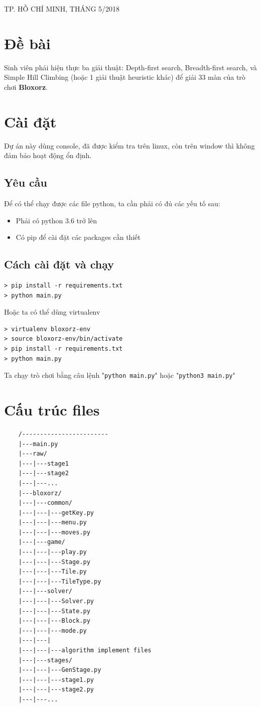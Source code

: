 \documentclass[a4paper, 11pt]{article}
\begin{document}
\begin{titlepage}
	\begin{center}
		{\footnotesize TP. HỒ CHÍ MINH, THÁNG 5/2018}
	\end{center}
\end{titlepage}



\newpage
\tableofcontents
\newpage
\section{Đề bài}
Sinh viên phải hiện thực ba giải thuật: Depth-first search, Breadth-first search,
và Simple Hill Climbing (hoặc 1 giải thuật heuristic khác) để giải 33 màn của trò chơi
\textbf{Bloxorz}.
\section{Cài đặt}
Dự án này dùng console, đã được kiểm tra trên linux, còn trên window thì không
đảm bảo hoạt động ổn định.
\subsection{Yêu cầu}
Để có thể chạy được các file python, ta cần phải có đủ các yếu tố sau:
\begin{itemize}
	\item Phải có python 3.6 trở lên
	\item Có pip để cài đặt các packages cần thiết
\end{itemize}
\subsection{Cách cài đặt và chạy}
\begin{lstlisting}
> pip install -r requirements.txt
> python main.py
\end{lstlisting}
Hoặc ta có thể dùng virtualenv
\begin{lstlisting}
> virtualenv bloxorz-env
> source bloxorz-env/bin/activate
> pip install -r requirements.txt
> python main.py    
\end{lstlisting}
Ta chạy trò chơi bằng câu lệnh "\texttt{python main.py}" hoặc "\texttt{python3 main.py}"
\newpage
\section{Cấu trúc files}
\begin{lstlisting}
    /------------------------
    |---main.py
    |---raw/
    |---|---stage1
    |---|---stage2
    |---|---...
    |---bloxorz/
    |---|---common/
    |---|---|---getKey.py
    |---|---|---menu.py
    |---|---|---moves.py
    |---|---game/
    |---|---|---play.py
    |---|---|---Stage.py
    |---|---|---Tile.py
    |---|---|---TileType.py
    |---|---solver/
    |---|---|---Solver.py
    |---|---|---State.py
    |---|---|---Block.py
    |---|---|---mode.py
    |---|---|
    |---|---|---algorithm implement files
    |---|---stages/
    |---|---|---GenStage.py
    |---|---|---stage1.py
    |---|---|---stage2.py
    |---|---...
\end{lstlisting}
\end{document}
